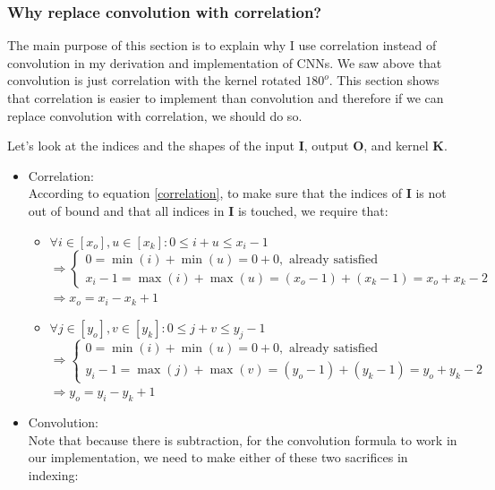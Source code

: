 \documentclass[12pt]{article}
\begin{document}
\subsubsection{Why replace convolution with correlation?}
The main purpose of this section is to explain why I use correlation instead of convolution in my derivation and implementation of CNNs. We saw above that convolution is just correlation with the kernel rotated {$180^o$}. This section shows that correlation is easier to implement than convolution and therefore if we can replace convolution with correlation, we should do so.

Let's look at the indices and the shapes of the input $\bm{I}$, output $\bm{O}$, and kernel $\bm{K}$.
\begin{itemize}
    \item Correlation:\\
    According to equation \eqref{correlation}, to make sure that the indices of $\bm{I}$ is not out of bound and that all indices in $\bm{I}$ is touched, we require that:
    \begin{itemize}
        \item $\forall i \in [x_o], u \in [x_k]: 0 \leq i + u \leq x_i - 1$\\
        \quad $\Rightarrow
        \begin{cases}
        0 = \min{(i)} + \min{(u)} = 0 + 0, \text{ already satisfied}\\
        x_i - 1 = \max{(i)} + \max{(u)} = (x_o - 1) + (x_k - 1) = x_o + x_k - 2
        \end{cases}
        $\\
        \quad $\Rightarrow x_o = x_i - x_k + 1$
        \item $\forall j \in [y_o], v \in [y_k]: 0 \leq j + v \leq y_j - 1$\\
        \quad $\Rightarrow
        \begin{cases}
        0 = \min{(i)} + \min{(u)} = 0 + 0, \text{ already satisfied}\\
        y_i - 1 = \max{(j)} + \max{(v)} = (y_o - 1) + (y_k - 1) = y_o + y_k - 2
        \end{cases}
        $\\
        \quad $\Rightarrow y_o = y_i - y_k + 1$
    \end{itemize}
    \item Convolution:\\
    Note that because there is subtraction, for the convolution formula to work in our implementation, we need to make either of these two sacrifices in indexing:

\end{itemize}
\end{document}
